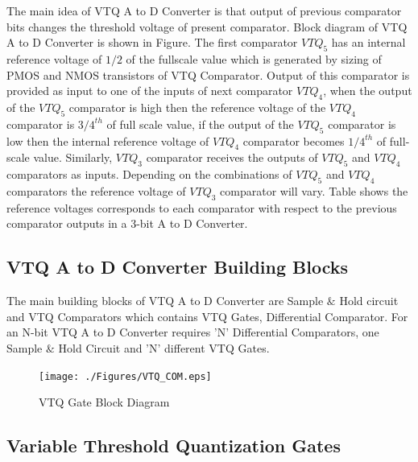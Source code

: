 \par
\hspace{1.2cm} The main idea of VTQ A to D Converter is that output of previous comparator bits changes the threshold voltage of present comparator. Block diagram of VTQ A to D Converter is shown in Figure. The first comparator $VTQ_5$ has an internal reference voltage of $1/2$ of the fullscale value which is generated by sizing of PMOS and NMOS transistors of VTQ Comparator. Output of this comparator is provided as input to one of the inputs of next comparator $VTQ_4$, when the output of the $VTQ_5$ comparator is high then the reference voltage of the $VTQ_4$ comparator is $3/4^{th}$ of full scale value, if the output of the $VTQ_5$ comparator is low then the internal reference voltage of $VTQ_4$ comparator becomes $1/4^{th}$ of full-scale value. Similarly, $VTQ_3$ comparator receives the outputs of $VTQ_5$ and $VTQ_4$ comparators as inputs. Depending on the combinations of $VTQ_5$ and $VTQ_4$ comparators the reference voltage of $VTQ_3$ comparator will vary. Table shows the reference voltages corresponds to each comparator with respect to the previous comparator outputs in a 3-bit A to D Converter.


\subsection{VTQ A to D Converter Building Blocks}
	
\par
\hspace{1.2cm}The main building blocks of VTQ A to D Converter are Sample $\&$ Hold circuit and VTQ Comparators which contains VTQ Gates, Differential Comparator. For an N-bit VTQ A to D Converter requires ’N’ Differential Comparators, one Sample $\&$ Hold Circuit and ’N’ different VTQ Gates.

\begin{figure}[ht]
\begin{center}
\texttt{[image: ./Figures/VTQ\_COM.eps]}
\caption{VTQ Gate Block Diagram }
\label{fig:VTQ_COM}
\end{center}
\end{figure}


\subsection{Variable Threshold Quantization Gates}

